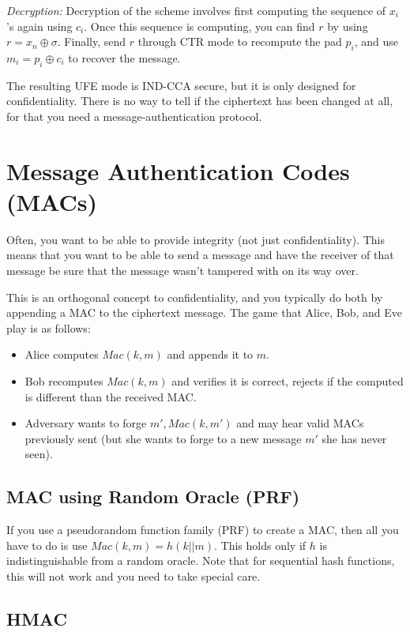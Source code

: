\documentclass[psamsfonts]{amsart}
\begin{document}
\emph{Decryption:} Decryption of the scheme involves first computing the sequence of $x_i$'s again using $c_i$. Once this sequence is computing, you can find $r$ by using $r = x_n \oplus \sigma$. Finally, send $r$ through CTR mode to recompute the pad $p_i$, and use $m_i = p_i \oplus c_i$ to recover the message.

The resulting UFE mode is IND-CCA secure, but it is only designed for confidentiality. There is no way to tell if the ciphertext has been changed at all, for that you need a message-authentication protocol.

\newpage

\section{Message Authentication Codes (MACs)}

Often, you want to be able to provide integrity (not just confidentiality). This means that you want to be able to send a message and have the receiver of that message be sure that the message wasn't tampered with on its way over.

This is an orthogonal concept to confidentiality, and you typically do both by appending a MAC to the ciphertext message. The game that Alice, Bob, and Eve play is as follows:

\begin{itemize}
  \item Alice computes $Mac(k, m)$ and appends it to $m$.
  \item Bob recomputes $Mac(k, m)$ and verifies it is correct, rejects if the computed is different than the received MAC.
  \item Adversary wants to forge $m', Mac(k, m')$ and may hear valid MACs previously sent (but she wants to forge to a new message $m'$ she has never seen).
\end{itemize}

\subsection{MAC using Random Oracle (PRF)}

If you use a pseudorandom function family (PRF) to create a MAC, then all you have to do is use $Mac(k, m) = h(k || m)$. This holds only if $h$ is indistinguishable from a random oracle. Note that for sequential hash functions, this will not work and you need to take special care.

\subsection{HMAC}
\end{document}
